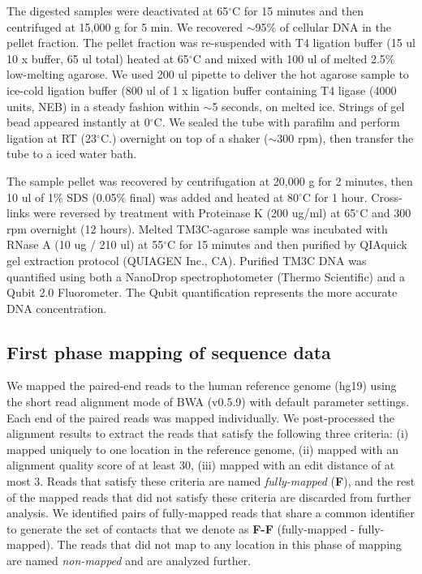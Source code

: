 The digested samples were deactivated at 65$^{\circ}\mathrm{C}$ for 15 minutes
and then centrifuged at 15,000 g for 5 min. We recovered $\sim$95\% of cellular
DNA in the pellet fraction. The pellet fraction was re-suspended with T4
ligation buffer (15 ul 10 x buffer, 65 ul total) heated at
65$^{\circ}\mathrm{C}$ and mixed with 100 ul of melted 2.5\% low-melting
agarose.  We used 200 ul pipette to deliver the hot agarose sample to ice-cold
ligation buffer (800 ul of 1 x ligation buffer containing T4 ligase (4000
units, NEB) in a steady fashion within $\sim$5 seconds, on melted ice. Strings
of gel bead appeared instantly at 0$^{\circ}\mathrm{C}$. We sealed the tube
with parafilm and perform ligation at RT (23$^{\circ}\mathrm{C}$.) overnight on
top of a shaker ($\sim$300 rpm), then transfer the tube to a iced water bath.

The sample pellet was recovered by centrifugation at 20,000 g for 2 minutes,
then 10 ul of 1\% SDS (0.05\% final) was added and heated at
80$^{\circ}\mathrm{C}$ for 1 hour. Cross-links were reversed by treatment with
Proteinase K (200 ug/ml) at 65$^{\circ}\mathrm{C}$ and 300 rpm overnight (12
hours). Melted TM3C-agarose sample was incubated with RNase A (10 ug / 210 ul)
at 55$^{\circ}\mathrm{C}$ for 15 minutes and then purified by QIAquick gel
extraction protocol (QUIAGEN Inc., CA). Purified TM3C DNA was quantified using
both a NanoDrop spectrophotometer (Thermo Scientific) and a Qubit 2.0
Fluorometer. The Qubit quantification represents the more accurate DNA
concentration.

\subsection*{First phase mapping of sequence data}
We mapped the paired-end reads to the human reference genome (hg19) using the
short read alignment mode of BWA (v0.5.9) with default parameter settings. Each
end of the paired reads was mapped individually. We post-processed the
alignment results to extract the reads that satisfy the following three
criteria: (i) mapped uniquely to one location in the reference genome, (ii)
mapped with an alignment quality score of at least 30, (iii) mapped with an
edit distance of at most 3. Reads that satisfy these criteria are named
\emph{fully-mapped} (\textbf{F}), and the rest of the mapped reads that did not
satisfy these criteria are discarded from further analysis. We identified pairs
of fully-mapped reads that share a common identifier to generate the set of
contacts that we denote as \textbf{F-F} (fully-mapped - fully-mapped). The
reads that did not map to any location in this phase of mapping are named
\emph{non-mapped} and are analyzed further.

